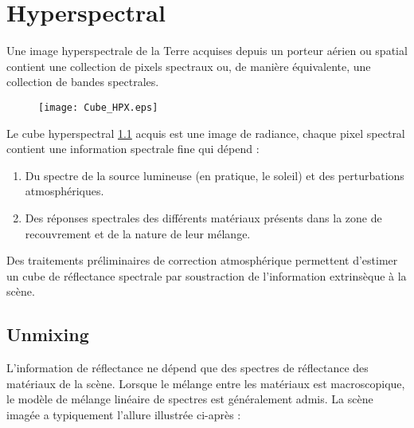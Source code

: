 \chapter{Hyperspectral}

Une image hyperspectrale de la Terre acquises depuis
un porteur aérien ou spatial contient une collection de pixels
spectraux ou, de manière équivalente, une collection de bandes
spectrales.

\begin{figure}[h]
  \centering
  \texttt{[image: Cube\_HPX.eps]}
  \label{fig:cube}
\end{figure}

Le cube hyperspectral \ref{fig:cube} acquis est une image de
radiance, chaque pixel spectral contient une information spectrale
fine qui dépend : 

\begin{enumerate}
\item{Du spectre de la source lumineuse (en pratique, le
soleil) et des perturbations atmosphériques.}
\item{Des réponses spectrales
des différents matériaux présents dans la zone de recouvrement et de la nature de leur mélange.}
\end{enumerate}

Des traitements préliminaires de
correction atmosphérique permettent d'estimer un cube de réflectance
spectrale par soustraction de l'information extrinsèque à la
scène. 

\section{Unmixing}

L'information de réflectance ne dépend que des spectres de
réflectance des matériaux de la scène. Lorsque le mélange entre les
matériaux est macroscopique, le modèle de mélange linéaire de spectres
est généralement admis. La scène imagée a typiquement l'allure
illustrée ci-après :



